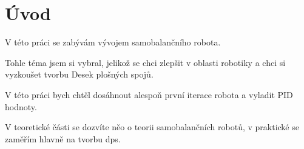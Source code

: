 \chapter*{Úvod}
{}
V této práci se zabývám vývojem samobalančního robota.
\newline

Tohle téma jsem si vybral, jelikož se chci zlepšit v oblasti robotiky a chci si vyzkoušet tvorbu Desek plošných spojů.
\newline

V této práci bych chtěl dosáhnout alespoň první iterace robota a vyladit PID hodnoty.
\newline

V teoretické části se dozvíte něo o teorii samobalančních robotů, v praktické se zaměřím hlavně na tvorbu \ac{dps}.





